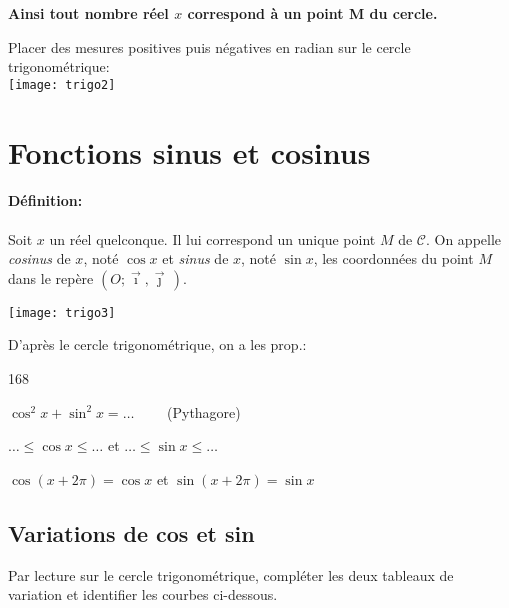 \documentclass[fontsize=23pt]{scrreprt}%
\newcommand{\V}[1]{\overrightarrow{#1}}
\begin{document}
\textbf{Ainsi tout nombre réel $x$ correspond à un point M du cercle.} 

Placer des mesures positives puis négatives en radian sur le cercle trigonométrique:\\[0.5cm]

\phantom{.}\hfill\texttt{[image: trigo2]}

\newpage
\section{Fonctions sinus et cosinus}%

\paragraph{Définition:} 
   Soit $x$ un réel quelconque. Il lui correspond un unique point $M$ de $\mathscr{C}$.
On appelle \emph{cosinus} de $x$, noté $\cos x$ et \emph{sinus} de $x$, noté $\sin x$, les coordonnées du point $M$ dans le repère $(O;\vec{\imath},\vec{\jmath}\,) $.
   
\begin{center}
\texttt{[image: trigo3]}
\end{center}

D'après le cercle trigonométrique, on a les prop.:

\begin{dingautolist}{168}
      \item $\cos^{2}x + \sin^{2}x=\dots{}\qquad$ (Pythagore)
      \item $\dots{} \leqslant \cos x \leqslant \dots{}$ \quad et \quad $\dots{} \leqslant \sin x \leqslant \dots{}$
      \item $\cos(x+2\pi)=\cos x$  et  $\sin(x+2\pi)=\sin x$
   \end{dingautolist}
 
\subsection*{Variations de cos et sin} %
Par lecture sur le cercle trigonométrique, compléter les deux tableaux de variation et identifier les courbes ci-dessous.
\end{document}
